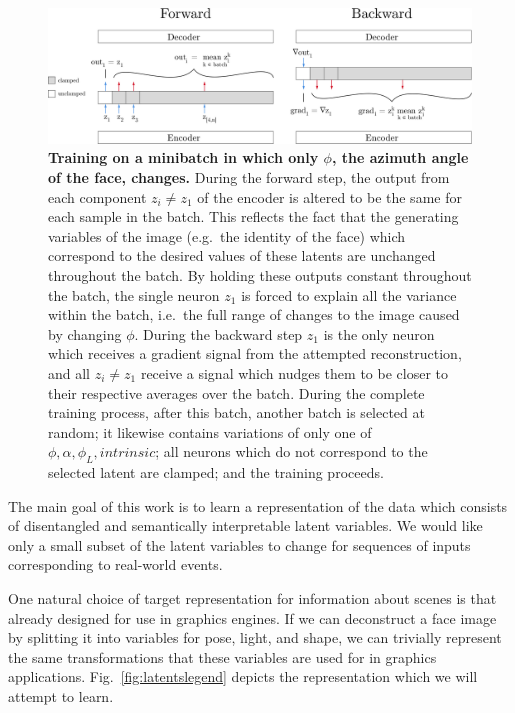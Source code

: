 \documentclass[12pt,twoside]{mitthesis}
\begin{document}
\begin{figure}[htbp]
\centering
\includegraphics{../figures/remastered_training_diagram.pdf}
\caption{\label{fig:selectivetraining}\textbf{Training on a minibatch in
which only \(\phi\), the azimuth angle of the face, changes.} During the
forward step, the output from each component \(z_i \neq z_1\) of the
encoder is altered to be the same for each sample in the batch. This
reflects the fact that the generating variables of the image (e.g.~the
identity of the face) which correspond to the desired values of these
latents are unchanged throughout the batch. By holding these outputs
constant throughout the batch, the single neuron \(z_1\) is forced to
explain all the variance within the batch, i.e.~the full range of
changes to the image caused by changing \(\phi\). During the backward
step \(z_1\) is the only neuron which receives a gradient signal from
the attempted reconstruction, and all \(z_i \neq z_1\) receive a signal
which nudges them to be closer to their respective averages over the
batch. During the complete training process, after this batch, another
batch is selected at random; it likewise contains variations of only one
of \({\phi, \alpha, \phi_L, intrinsic}\); all neurons which do not
correspond to the selected latent are clamped; and the training
proceeds.}
\end{figure}

The main goal of this work is to learn a representation of the data
which consists of disentangled and semantically interpretable latent
variables. We would like only a small subset of the latent variables to
change for sequences of inputs corresponding to real-world events.

One natural choice of target representation for information about scenes
is that already designed for use in graphics engines. If we can
deconstruct a face image by splitting it into variables for pose, light,
and shape, we can trivially represent the same transformations that
these variables are used for in graphics applications.
Fig.~\ref{fig:latentslegend} depicts the representation which we will
attempt to learn.
\end{document}
